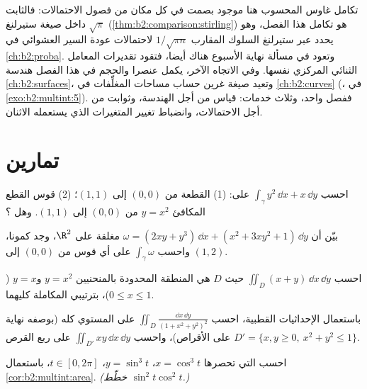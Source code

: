 \begin{remark}
تكامل غاوس المحسوب هنا موجود بصمت في كل مكان من فصول الاحتمالات:
فالثابت $\sqrt\pi$ داخل صيغة ستيرلنغ (\cref{thm:b2:comparison:stirling}) هو تكامل هذا الفصل، وهو
يحدد عبر ستيرلنغ السلوك المقارب $1/\sqrt{\pi n}$ لاحتمالات عودة السير
العشوائي في \cref{ch:b2:proba}. وتعود  في مسألة نهاية الأسبوع
هناك أيضا، فتقود تقديرات المعامل الثنائي المركزي نفسها. وفي الاتجاه
الآخر، يكمل عنصرا  والحجم في هذا الفصل هندسة \cref{ch:b2:surfaces}، وتعيد
صيغة غرين حساب مساحات المغلِّفات في \cref{ch:b2:curves} (، في \cref{exo:b2:multint:5}).
ففصل واحد، وثلاث خدمات: قياس من أجل الهندسة، وثوابت من أجل
الاحتمالات، وانضباط تغيير المتغيرات الذي يستعمله الاثنان.
\end{remark}

\section{تمارين}

\begin{exercise}[$\star$]\label{exo:b2:multint:1}
احسب $\int_\gamma y^2\,\dd x + x\,\dd y$ على: (1) القطعة من $(0,0)$ إلى $(1,1)$؛ (2) قوس القطع
المكافئ $y = x^2$ من $(0,0)$ إلى $(1,1)$. وهل ؟
\end{exercise}

\begin{exercise}[$\star$]\label{exo:b2:multint:2}
بيّن أن $\omega = (2xy + y^3)\,\dd x + (x^2 + 3xy^2 + 1)\,\dd y$ مغلقة على $\R^2$، وجد كمونا، واحسب $\int_\gamma\omega$ على أي
قوس من $(0, 0)$ إلى $(1, 2)$.
\end{exercise}

\begin{exercise}[$\star$]\label{exo:b2:multint:3}
احسب $\iint_D (x + y)\,\dd x\,\dd y$ حيث $D$ هي المنطقة المحدودة بالمنحنيين $y = x^2$
و$y = x$ ($0 \leq x \leq 1$)، بترتيبي المكاملة كليهما.
\end{exercise}

\begin{exercise}[$\star\star$]\label{exo:b2:multint:4}
باستعمال الإحداثيات القطبية، احسب $\iint_D \frac{\dd x\,\dd y}{(1 +
x^2 + y^2)^2}$ على المستوي كله (بوصفه
نهاية على الأقراص)، واحسب $\iint_{D'} xy\,\dd x\,\dd y$ على ربع القرص $D' = \{x, y
\geq 0,\ x^2 + y^2 \leq 1\}$.
\end{exercise}

\begin{exercise}[$\star\star$]\label{exo:b2:multint:5}
احسب  التي تحصرها  $x = \cos^3 t$، $y =
\sin^3 t$، $t \in [0, 2\pi]$، باستعمال
\cref{cor:b2:multint:area}. \emph{(خطّط $\sin^2 t\cos^2 t$.)}
\end{exercise}

